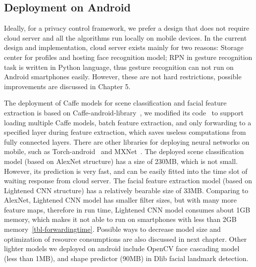 \subsection{Deployment on Android}

Ideally, for a privacy control framework, we prefer a design that does not require cloud server and all the algorithms run locally on mobile devices. In the current design and implementation, cloud server exists mainly for two reasons:  Storage center for profiles and hosting face recognition model;  RPN in gesture recognition task is written in Python language, thus gesture recognition can not run on Android smartphones easily. However, these are not hard restrictions, possible improvements are discussed in Chapter 5.

The deployment of Caffe models for scene classification and facial feature extraction is based on Caffe-android-library~\cite{links:caffeandroidlib}, we modified its code~\cite{links:caffeandroidlibzr} to support loading multiple Caffe models, batch feature extraction, and only forwarding to a specified layer during feature extraction, which saves useless computations from fully connected layers. There are other libraries for deploying neural networks on mobile, such as Torch-android~\cite{links:torchandroid} and MXNet~\cite{links:mxnetmobile}. The deployed scene classification model (based on AlexNet structure) has a size of 230MB, which is not small. However, its prediction is very fast, and can be easily fitted into the time slot of waiting response from cloud server. The facial feature extraction model (based on Lightened CNN structure) has a relatively bearable size of 33MB. Comparing to AlexNet, Lightened CNN model has smaller filter sizes, but with many more feature maps, therefore in run time, Lightened CNN model consumes about 1GB memory, which makes it not able to run on smartphones with less than 2GB memory~\ref{tbl-forwardingtime}. Possible ways to decrease model size and optimization of resource consumptions are also discussed in next chapter. Other lighter models we deployed on android include OpenCV face cascading model (less than 1MB), and shape predictor (90MB) in Dlib facial landmark detection.


